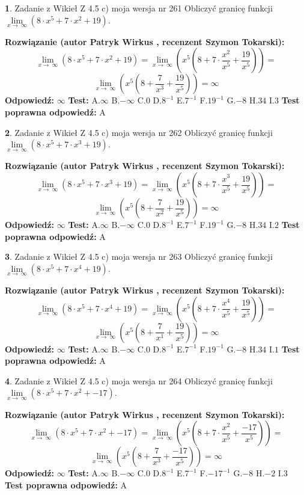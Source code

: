 \documentclass[12pt, a4paper]{article}
\theoremstyle{definition} %
\newtheorem{zad}{}
\newcommand{\zadStart}[1]{\begin{zad}#1\newline}
\newcommand{\zadStop}{\end{zad}}
\newcommand{\rozwStart}[2]{\noindent \textbf{Rozwiązanie (autor #1 , recenzent #2): }\newline}
\newcommand{\rozwStop}{\newline}
\newcommand{\odpStart}{\noindent \textbf{Odpowiedź:}\newline}
\newcommand{\odpStop}{\newline}
\newcommand{\testStart}{\noindent \textbf{Test:}\newline}
\newcommand{\testStop}{\newline}
\newcommand{\kluczStart}{\noindent \textbf{Test poprawna odpowiedź:}\newline}
\newcommand{\kluczStop}{\newline}
\begin{document}
\zadStart{Zadanie z Wikieł Z 4.5 c) moja wersja nr 261}
Obliczyć granicę funkcji  $\lim\limits_{x\to\ \infty}(8 \cdot x^{5}+7 \cdot x^{2}+19)$.
\zadStop
\rozwStart{Patryk Wirkus}{Szymon Tokarski}
$$\lim\limits_{x\to\ \infty}(8 \cdot x^{5}+7 \cdot x^{2}+19) = \lim\limits_{x\to\ \infty}(x^{5}(8 +7 \cdot \frac{x^{2}}{x^{5}}+\frac{19}{x^{5}})) =$$ $$\lim\limits_{x\to\ \infty}(x^{5}(8 +\frac{7}{x^{3}}+\frac{19}{x^{5}})) =\infty$$
\rozwStop
\odpStart
$\infty$
\odpStop
\testStart
A.$\infty$ B.$-\infty$ C.$0$ D.$8^{-1}$ E.$7^{-1}$
F.$19^{-1}$ G.$-8$
H.$34$
I.$3$
\testStop
\kluczStart
A
\kluczStop



\zadStart{Zadanie z Wikieł Z 4.5 c) moja wersja nr 262}
Obliczyć granicę funkcji  $\lim\limits_{x\to\ \infty}(8 \cdot x^{5}+7 \cdot x^{3}+19)$.
\zadStop
\rozwStart{Patryk Wirkus}{Szymon Tokarski}
$$\lim\limits_{x\to\ \infty}(8 \cdot x^{5}+7 \cdot x^{3}+19) = \lim\limits_{x\to\ \infty}(x^{5}(8 +7 \cdot \frac{x^{3}}{x^{5}}+\frac{19}{x^{5}})) =$$ $$\lim\limits_{x\to\ \infty}(x^{5}(8 +\frac{7}{x^{2}}+\frac{19}{x^{5}})) =\infty$$
\rozwStop
\odpStart
$\infty$
\odpStop
\testStart
A.$\infty$ B.$-\infty$ C.$0$ D.$8^{-1}$ E.$7^{-1}$
F.$19^{-1}$ G.$-8$
H.$34$
I.$2$
\testStop
\kluczStart
A
\kluczStop



\zadStart{Zadanie z Wikieł Z 4.5 c) moja wersja nr 263}
Obliczyć granicę funkcji  $\lim\limits_{x\to\ \infty}(8 \cdot x^{5}+7 \cdot x^{4}+19)$.
\zadStop
\rozwStart{Patryk Wirkus}{Szymon Tokarski}
$$\lim\limits_{x\to\ \infty}(8 \cdot x^{5}+7 \cdot x^{4}+19) = \lim\limits_{x\to\ \infty}(x^{5}(8 +7 \cdot \frac{x^{4}}{x^{5}}+\frac{19}{x^{5}})) =$$ $$\lim\limits_{x\to\ \infty}(x^{5}(8 +\frac{7}{x^{1}}+\frac{19}{x^{5}})) =\infty$$
\rozwStop
\odpStart
$\infty$
\odpStop
\testStart
A.$\infty$ B.$-\infty$ C.$0$ D.$8^{-1}$ E.$7^{-1}$
F.$19^{-1}$ G.$-8$
H.$34$
I.$1$
\testStop
\kluczStart
A
\kluczStop



\zadStart{Zadanie z Wikieł Z 4.5 c) moja wersja nr 264}
Obliczyć granicę funkcji  $\lim\limits_{x\to\ \infty}(8 \cdot x^{5}+7 \cdot x^{2}+-17)$.
\zadStop
\rozwStart{Patryk Wirkus}{Szymon Tokarski}
$$\lim\limits_{x\to\ \infty}(8 \cdot x^{5}+7 \cdot x^{2}+-17) = \lim\limits_{x\to\ \infty}(x^{5}(8 +7 \cdot \frac{x^{2}}{x^{5}}+\frac{-17}{x^{5}})) =$$ $$\lim\limits_{x\to\ \infty}(x^{5}(8 +\frac{7}{x^{3}}+\frac{-17}{x^{5}})) =\infty$$
\rozwStop
\odpStart
$\infty$
\odpStop
\testStart
A.$\infty$ B.$-\infty$ C.$0$ D.$8^{-1}$ E.$7^{-1}$
F.$-17^{-1}$ G.$-8$
H.$-2$
I.$3$
\testStop
\kluczStart
A
\kluczStop
\end{document}
